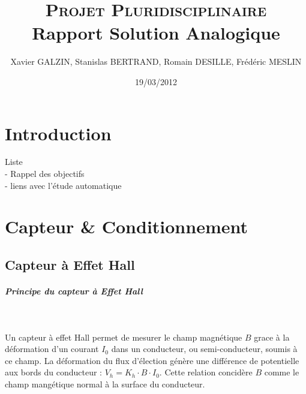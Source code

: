 \documentclass[11pt, french]{article} %
\title{\textsc{Projet Pluridisciplinaire} \\ Rapport Solution Analogique}
\author{Xavier GALZIN, Stanislas BERTRAND, Romain DESILLE, Frédéric MESLIN}
\date{19/03/2012}
\begin{document}
\maketitle

\pagebreak

\section*{Introduction}
Liste
\\- Rappel des objectifs
\\- liens avec l'étude automatique



\section{Capteur \& Conditionnement}
\subsection{Capteur à Effet Hall}


\subparagraph*{Principe du capteur à Effet Hall}~\\
\begin{minipage}[t]{10cm}
\vspace{-0.3cm}
Un capteur à effet Hall permet de mesurer le champ magnétique $B$ grace à la déformation d'un courant $I_0$ dans un conducteur, ou semi-conducteur, soumis à ce champ. La déformation du flux d'élection génère une différence de potentielle aux bords du conducteur : $V_h =K_h \cdot B \cdot I_0$. Cette relation concidère $B$ comme le champ mangétique normal à la surface du conducteur.
\end{minipage}
\end{document}
